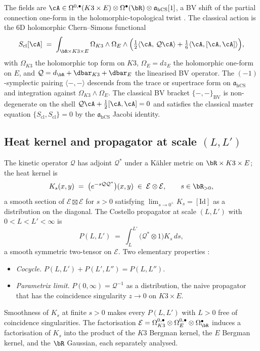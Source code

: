 The fields are $\cA\in\Omega^{0,\bullet}(K3\times E)\otimes
\Omega^\bullet(\bR)\otimes\mathfrak a_{\mathrm{hCS}}[1]$, a BV shift of the
partial connection one-form in the holomorphic-topological twist
\cite{CL16,CDG2023}. The classical action is the 6D
holomorphic Chern--Simons functional
\begin{equation}\label{eq:costello-trace-classical-action}
 S_{\mathrm{cl}}[\cA]
 \;=\;
 \int_{\bR\times K3\times E}
 \Omega_{K3}\wedge\Omega_E\wedge
 \Bigl(\tfrac{1}{2}\langle\cA,\,\mathcal{Q}\cA\rangle
 + \tfrac{1}{6}\langle\cA,[\cA,\cA]\rangle\Bigr),
\end{equation}
with $\Omega_{K3}$ the holomorphic top form on $K3$,
$\Omega_E = dz_E$ the holomorphic one-form on $E$, and
$\mathcal{Q} = d_{\bR} + \dbar_{K3} + \dbar_E$ the linearised BV
operator. The $(-1)$-symplectic pairing
$\langle-,-\rangle$ descends from the trace or supertrace form on
\(\mathfrak a_{\mathrm{hCS}}\) and integration against
$\Omega_{K3}\wedge\Omega_E$. The classical BV
bracket $\{-,-\}_{\mathrm{BV}}$ is non-degenerate on the shell
$\mathcal{Q}\cA + \tfrac{1}{2}[\cA,\cA] = 0$ and satisfies the classical
master equation $\{S_{\mathrm{cl}},S_{\mathrm{cl}}\} = 0$ by the
\(\mathfrak a_{\mathrm{hCS}}\) Jacobi identity.

\subsection{Heat kernel and propagator at scale $(L,L')$}
\label{subsec:costello-trace-heat-kernel}

The kinetic operator $\mathcal{Q}$ has adjoint $\mathcal{Q}^*$ under a
Kähler metric on $\bR\times K3\times E$; the heat kernel is
\begin{equation}\label{eq:costello-trace-heat-kernel}
 K_s(x, y)
 \;=\;
 \bigl(e^{-s\mathcal{Q}\mathcal{Q}^*}\bigr)(x, y)
 \;\in\;
 \mathcal{E}\otimes\mathcal{E},
 \qquad s\in\bR_{>0},
\end{equation}
a smooth section of $\mathcal{E}\boxtimes\mathcal{E}$ for $s>0$
satisfying $\lim_{s\to 0^+}K_s = [\mathrm{Id}]$ as a distribution on
the diagonal. The Costello propagator at scale $(L,L')$ with
$0 < L < L' < \infty$ is
\begin{equation}\label{eq:costello-trace-propagator}
 P(L, L')
 \;=\;
 \int_{L}^{L'}\!\bigl(\mathcal{Q}^*\otimes 1\bigr)K_s\,ds,
\end{equation}
a smooth symmetric two-tensor on $\mathcal{E}$. Two elementary properties
\cite[Lemma 2.2.1]{Cos11}:
\begin{itemize}
\item \emph{Cocycle.} $P(L,L') + P(L',L'') = P(L,L'')$.
\item \emph{Parametrix limit.} $P(0,\infty) = \mathcal{Q}^{-1}$ as a
 distribution, the naive propagator that has the coincidence
 singularity $z\to 0$ on $K3\times E$.
\end{itemize}
Smoothness of $K_s$ at finite $s>0$ makes every $P(L,L')$ with $L>0$
free of coincidence singularities. The factorisation
$\mathcal{E} = \Omega^{0,\bullet}_{K3}\otimes\Omega^{0,\bullet}_E\otimes
\Omega^\bullet_{\bR}$ induces a factorisation of $K_s$ into the product
of the $K3$ Bergman kernel, the $E$ Bergman kernel, and the $\bR$
Gaussian, each separately analysed.

